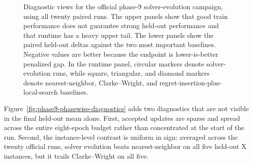 \begin{figure}[p]
\caption[Phase-9 diagnostic views]{Diagnostic views for the official phase-9 solver-evolution campaign, using all twenty paired
runs. The upper panels show that good train performance does not guarantee strong held-out
performance and that runtime has a heavy upper tail. The lower panels show the paired held-out
deltas against the two most important baselines. Negative values are better because the endpoint is
lower-is-better penalized gap. In the runtime panel, circular markers denote solver-evolution
runs, while square, triangular, and diamond markers denote nearest-neighbor, Clarke--Wright, and
regret-insertion-plus-local-search baselines.}
\label{fig:phase9-diagnostics}
\end{figure}

Figure~\ref{fig:phase9-phasewise-diagnostics} adds two diagnostics that are not visible in the
final held-out mean alone. First, accepted updates are sparse and spread across the entire
eight-epoch budget rather than concentrated at the start of the run. Second, the instance-level
contrast is uniform in sign: averaged across the twenty official runs, solver evolution beats
nearest-neighbor on all five held-out X instances, but it trails Clarke--Wright on all five.

